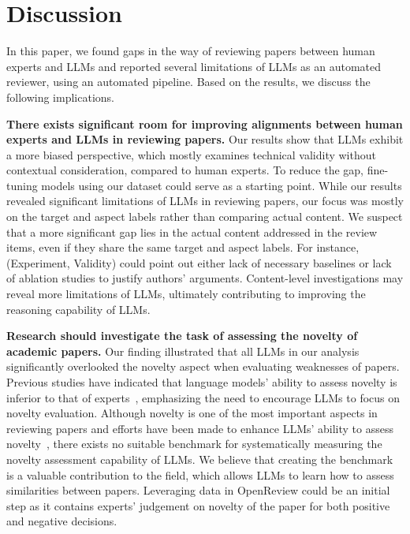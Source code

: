 
\section{Discussion}

In this paper, we found gaps in the way of reviewing papers between human experts and LLMs and reported several limitations of LLMs as an automated reviewer, using an automated pipeline. Based on the results, we discuss the following implications.

\newpage
\textbf{There exists significant room for improving alignments between human experts and LLMs in reviewing papers.} Our results show that LLMs exhibit a more biased perspective, which mostly examines technical validity without contextual consideration, compared to human experts. To reduce the gap, fine-tuning models using our dataset could serve as a starting point. While our results revealed significant limitations of LLMs in reviewing papers, our focus was mostly on the target and aspect labels rather than comparing actual content. We suspect that a more significant gap lies in the actual content addressed in the review items, even if they share the same target and aspect labels. For instance, (Experiment, Validity) could point out either lack of necessary baselines or lack of ablation studies to justify authors' arguments. Content-level investigations may reveal more limitations of LLMs, ultimately contributing to improving the reasoning capability of LLMs. %

\textbf{Research should investigate the task of assessing the novelty of academic papers.} Our finding illustrated that all LLMs in our analysis significantly overlooked the novelty aspect when evaluating weaknesses of papers. Previous studies have indicated that language models’ ability to assess novelty is inferior to that of experts~\cite{Just02072024, Lin2024EvaluatingAE}, emphasizing the need to encourage LLMs to focus on novelty evaluation. Although novelty is one of the most important aspects in reviewing papers and efforts have been made to enhance LLMs' ability to assess novelty~\citep{Bougie2024GenerativeAR, Lin2024EvaluatingAE}, there exists no suitable benchmark for systematically measuring the novelty assessment capability of LLMs. We believe that creating the benchmark is a valuable contribution to the field, which allows LLMs to learn how to assess similarities between papers. Leveraging data in OpenReview could be an initial step as it contains experts' judgement on novelty of the paper for both positive and negative decisions.

